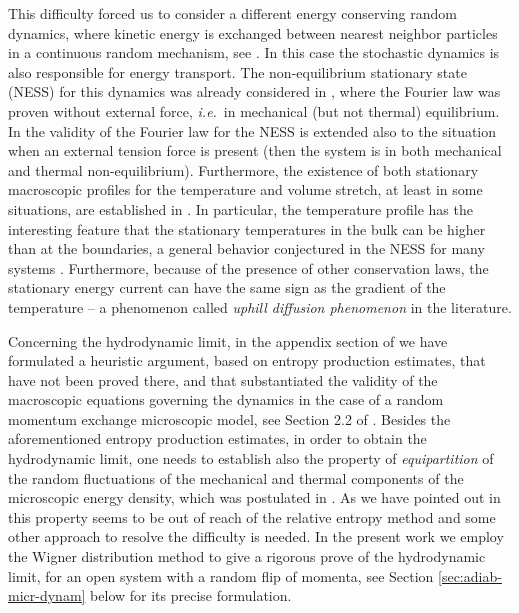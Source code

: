 \documentclass[EJP]{ejpecp} %
\numberwithin{equation}{section}
\begin{document}
This difficulty forced us to consider a different energy conserving random dynamics,
where kinetic energy is exchanged between nearest neighbor particles in a continuous random
mechanism, see \cite{kos2}.
In this case the stochastic dynamics is also
responsible for energy transport. The non-equilibrium stationary
state (NESS) for this dynamics was already considered in \cite{bo1}, 
where the Fourier law was proven without external force,
\textit{i.e.}~in mechanical (but not thermal) equilibrium.
In \cite{kos2} the validity of the Fourier law for the NESS is extended
  also to the situation when  an external tension force is present
  (then the system is in both  mechanical and thermal non-equilibrium).
  Furthermore, the existence of both stationary macroscopic profiles for
the temperature and volume
stretch,  at least in some situations, are  established
in  \cite{kos2}.
In particular, the temperature profile has the interesting feature that
the stationary temperatures in the
bulk can be higher than at the boundaries, a general behavior
conjectured in the NESS for many systems \cite{olla19}.
Furthermore, because of the presence of other conservation laws,
the stationary energy current can have the same sign as the gradient
of the temperature -- {\color{cyan} a} phenomenon called 
 \emph{uphill diffusion phenomenon} in the literature.  


Concerning the hydrodynamic limit, in the appendix section of  \cite{kos2}  we have 
formulated a heuristic argument, based on entropy production
estimates, that have not been proved there, and that substantiated the
validity of the macroscopic equations governing the dynamics in the case
of a random momentum exchange microscopic model, see Section 2.2 of
\cite{kos2}. Besides the aforementioned  entropy production
estimates, in order to obtain the hydrodynamic limit, one needs 
to establish also  the property of 
\emph{equipartition} of the random fluctuations of the mechanical and thermal
components of the microscopic energy density, which was postulated in
\cite[identity (A.46)]{kos2}. As we have pointed out in
\cite{kos2} this property seems to
be out of reach of the relative entropy method and some other approach
to resolve the difficulty is needed.  
In the present work we employ the Wigner distribution method to give a
rigorous prove of the hydrodynamic limit, for an  open system with a
random flip of momenta,
see Section \ref{sec:adiab-micr-dynam} below for its precise
formulation.
\end{document}
